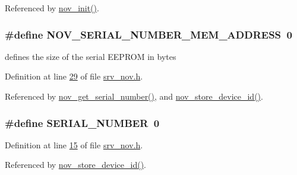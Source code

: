 Referenced by \hyperlink{a00060_source_l00159}{nov\+\_\+init()}.

\hypertarget{a00029_ab7dc1ea8a7f6e16cf27fbfe88efd7285}{
\subsubsection[{N\+O\+V\+\_\+\+S\+E\+R\+I\+A\+L\+\_\+\+N\+U\+M\+B\+E\+R\+\_\+\+M\+E\+M\+\_\+\+A\+D\+D\+R\+E\+S\+S}]{\setlength{\rightskip}{0pt plus 5cm}\#define N\+O\+V\+\_\+\+S\+E\+R\+I\+A\+L\+\_\+\+N\+U\+M\+B\+E\+R\+\_\+\+M\+E\+M\+\_\+\+A\+D\+D\+R\+E\+S\+S~0}}\label{a00029_ab7dc1ea8a7f6e16cf27fbfe88efd7285}


defines the size of the serial E\+E\+P\+R\+O\+M in bytes 



Definition at line \hyperlink{a00029_source_l00029}{29} of file \hyperlink{a00029_source}{srv\+\_\+nov.\+h}.



Referenced by \hyperlink{a00060_source_l00464}{nov\+\_\+get\+\_\+serial\+\_\+number()}, and \hyperlink{a00060_source_l00411}{nov\+\_\+store\+\_\+device\+\_\+id()}.

\hypertarget{a00029_ad8a20d143f6a7579ed227578aeddec21}{
\subsubsection[{S\+E\+R\+I\+A\+L\+\_\+\+N\+U\+M\+B\+E\+R}]{\setlength{\rightskip}{0pt plus 5cm}\#define S\+E\+R\+I\+A\+L\+\_\+\+N\+U\+M\+B\+E\+R~0}}\label{a00029_ad8a20d143f6a7579ed227578aeddec21}


Definition at line \hyperlink{a00029_source_l00015}{15} of file \hyperlink{a00029_source}{srv\+\_\+nov.\+h}.



Referenced by \hyperlink{a00060_source_l00411}{nov\+\_\+store\+\_\+device\+\_\+id()}.



